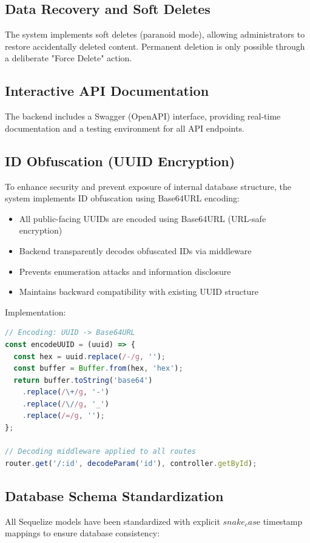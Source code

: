 \documentclass[12pt,a4paper]{article}
\begin{document}
\subsection{Data Recovery and Soft Deletes}
The system implements soft deletes (paranoid mode), allowing administrators to restore accidentally deleted content. Permanent deletion is only possible through a deliberate "Force Delete" action.

\subsection{Interactive API Documentation}
The backend includes a Swagger (OpenAPI) interface, providing real-time documentation and a testing environment for all API endpoints.

\subsection{ID Obfuscation (UUID Encryption)}
To enhance security and prevent exposure of internal database structure, the system implements ID obfuscation using Base64URL encoding:

\begin{itemize}
    \item All public-facing UUIDs are encoded using Base64URL (URL-safe encryption)
    \item Backend transparently decodes obfuscated IDs via middleware
    \item Prevents enumeration attacks and information disclosure
    \item Maintains backward compatibility with existing UUID structure
\end{itemize}

Implementation:
\begin{lstlisting}[language=JavaScript]
// Encoding: UUID -> Base64URL
const encodeUUID = (uuid) => {
  const hex = uuid.replace(/-/g, '');
  const buffer = Buffer.from(hex, 'hex');
  return buffer.toString('base64')
    .replace(/\+/g, '-')
    .replace(/\//g, '_')
    .replace(/=/g, '');
};

// Decoding middleware applied to all routes
router.get('/:id', decodeParam('id'), controller.getById);
\end{lstlisting}

\subsection{Database Schema Standardization}
All Sequelize models have been standardized with explicit $snake_cas$e timestamp mappings to ensure database consistency:
\end{document}
